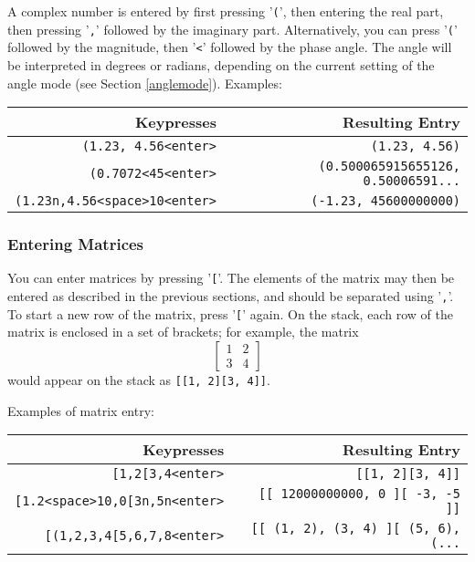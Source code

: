 \documentclass[11pt,notitlepage]{article}
\begin{document}
A complex number is entered by first pressing '{\tt (}', then entering the real
part, then pressing '{\tt ,}' followed by the imaginary part.  Alternatively, you
can press '{\tt (}' followed by the magnitude, then '{\tt <}' followed by the
phase angle.  The angle will be interpreted in degrees or radians, depending on
the current setting of the angle mode (see Section \ref{anglemode}).  Examples:
\begin{center}
   \begin{tabular}[t]{|r|r|}
      \hline Keypresses & Resulting Entry \\
      \hline
      {\tt (1.23, 4.56<enter>} & {\tt (1.23, 4.56)} \\
      {\tt (0.7072<45<enter>} & {\tt (0.500065915655126, 0.50006591...} \\
      {\tt (1.23n,4.56<space>10<enter>} & {\tt (-1.23, 45600000000)} \\
      \hline
   \end{tabular}
\end{center}

\subsubsection{Entering Matrices}
You can enter matrices by pressing '{\tt [}'.  The elements of the matrix may then be
entered as described in the previous sections, and should be separated using
'{\tt ,}'.  To start a new row of the matrix, press '{\tt [}' again.  On the
stack, each row of the matrix is enclosed in a set of brackets; for example, the
matrix
\begin{displaymath}
   \left[
   \begin{matrix}
      1 & 2 \\
      3 & 4
   \end{matrix}
   \right]
\end{displaymath}
would appear on the stack as {\tt [[1, 2][3, 4]]}.

Examples of matrix entry:
\begin{center}
   \begin{tabular}[t]{|r|r|}
      \hline Keypresses & Resulting Entry \\
      \hline
      {\tt [1,2[3,4<enter>} & {\tt [[1, 2][3, 4]]} \\
      {\tt [1.2<space>10,0[3n,5n<enter>} & {\tt [[ 12000000000, 0 ][ -3, -5 ]]} \\
      {\tt [(1,2,3,4[5,6,7,8<enter>} & {\tt [[ (1, 2), (3, 4) ][ (5, 6), (...} \\
      \hline
   \end{tabular}
\end{center}
\end{document}
